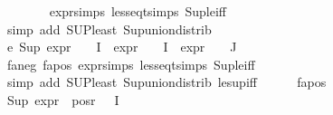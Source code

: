 \begin{isabellebody}
\ \ \ \ \ \ \isamarkupfalse%
\ expr{\isachardot}{\kern0pt}simps\ less{\isacharunderscore}{\kern0pt}eq{\isacharunderscore}{\kern0pt}t{\isachardot}{\kern0pt}simps\ Sup{\isacharunderscore}{\kern0pt}le{\isacharunderscore}{\kern0pt}iff\isanewline
\ \ \ \ \ \ \isamarkupfalse%
\ {\isacharparenleft}{\kern0pt}simp\ add{\isacharcolon}{\kern0pt}\ SUP{\isacharunderscore}{\kern0pt}least\ Sup{\isacharunderscore}{\kern0pt}union{\isacharunderscore}{\kern0pt}distrib{\isacharparenright}{\kern0pt}{\isacharplus}{\kern0pt}\isanewline
\ \ \ \ \isamarkupfalse%
\ e{}{\isacharcolon}{\kern0pt}\ {\isachardoublequoteopen}{\isacharparenleft}{\kern0pt}Sup\ {\isacharparenleft}{\kern0pt}{\isacharparenleft}{\kern0pt}expr{\isacharunderscore}{\kern0pt}{}\ {\isasymcirc}\ {\isasymPhi}{\isacharparenright}{\kern0pt}\ {\isacharbackquote}{\kern0pt}\ I\ {\isasymunion}\ {\isacharparenleft}{\kern0pt}expr{\isacharunderscore}{\kern0pt}{}\ {\isasymcirc}\ {\isasymPhi}{\isacharparenright}{\kern0pt}\ {\isacharbackquote}{\kern0pt}\ I\ {\isasymunion}\ {\isacharparenleft}{\kern0pt}expr{\isacharunderscore}{\kern0pt}{}\ {\isasymcirc}\ {\isasymPhi}{\isacharparenright}{\kern0pt}\ {\isacharbackquote}{\kern0pt}\ J{\isacharparenright}{\kern0pt}{\isacharparenright}{\kern0pt}\ {\isasymle}\ {}{\isachardoublequoteclose}\isanewline
\ \ \ \ \ \ \isamarkupfalse%
\ fa{\isacharunderscore}{\kern0pt}neg\ fa{\isacharunderscore}{\kern0pt}pos\ expr{\isachardot}{\kern0pt}simps\ less{\isacharunderscore}{\kern0pt}eq{\isacharunderscore}{\kern0pt}t{\isachardot}{\kern0pt}simps\ Sup{\isacharunderscore}{\kern0pt}le{\isacharunderscore}{\kern0pt}iff\isanewline
\ \ \ \ \ \ \isamarkupfalse%
\ {\isacharparenleft}{\kern0pt}simp\ add{\isacharcolon}{\kern0pt}\ SUP{\isacharunderscore}{\kern0pt}least\ Sup{\isacharunderscore}{\kern0pt}union{\isacharunderscore}{\kern0pt}distrib\ le{\isacharunderscore}{\kern0pt}sup{\isacharunderscore}{\kern0pt}iff{\isacharparenright}{\kern0pt}\isanewline
\ \ \ \ \isamarkupfalse%
\ fa{\isacharunderscore}{\kern0pt}pos\ \isamarkupfalse%
\ {\isachardoublequoteopen}Sup\ {\isacharparenleft}{\kern0pt}expr{\isacharunderscore}{\kern0pt}{}\ {\isacharbackquote}{\kern0pt}\ {\isacharparenleft}{\kern0pt}pos{\isacharunderscore}{\kern0pt}r\ {\isacharparenleft}{\kern0pt}{\isasymPhi}\ {\isacharbackquote}{\kern0pt}\ I{\isacharparenright}{\kern0pt}{\isacharparenright}{\kern0pt}{\isacharparenright}{\kern0pt}\ {\isasymle}\ {}{\isachardoublequoteclose}\isanewline

\end{isabellebody}
